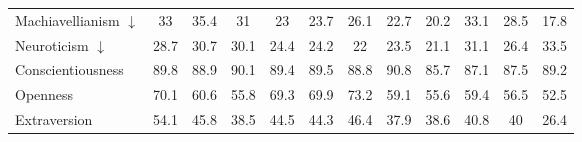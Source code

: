 \begin{table}[ht]
\begin{tabular}{l|ccccc|ccccc|c}
Machiavellianism $\downarrow$ & \cellcolor{myred!78} 33 & \cellcolor{myred!90} 35.4 & \cellcolor{myred!68} 31 & \cellcolor{myred!27} 23 & \cellcolor{myred!30} 23.7 & \cellcolor{myred!42} 26.1 & \cellcolor{myred!25} 22.7 & \cellcolor{myred!12} 20.2 & \cellcolor{myred!78} 33.1 & \cellcolor{myred!55} 28.5 & 17.8 \\
Neuroticism $\downarrow$ & \cellcolor{royalblue!35} 28.7 & \cellcolor{royalblue!20} 30.7 & \cellcolor{royalblue!25} 30.1 & \cellcolor{royalblue!66} 24.4 & \cellcolor{royalblue!68} 24.2 & \cellcolor{royalblue!83} 22 & \cellcolor{royalblue!73} 23.5 & \cellcolor{royalblue!90} 21.1 & \cellcolor{royalblue!17} 31.1 & \cellcolor{royalblue!52} 26.4 & 33.5 \\
Conscientiousness & \cellcolor{royalblue!15} 89.8 & \cellcolor{myred!8} 88.9 & \cellcolor{royalblue!23} 90.1 & \cellcolor{royalblue!5} 89.4 & \cellcolor{royalblue!8} 89.5 & \cellcolor{myred!10} 88.8 & \cellcolor{royalblue!41} 90.8 & \cellcolor{myred!90} 85.7 & \cellcolor{myred!54} 87.1 & \cellcolor{myred!44} 87.5 & 89.2 \\
Openness & \cellcolor{royalblue!77} 70.1 & \cellcolor{royalblue!35} 60.6 & \cellcolor{royalblue!14} 55.8 & \cellcolor{royalblue!73} 69.3 & \cellcolor{royalblue!76} 69.9 & \cellcolor{royalblue!90} 73.2 & \cellcolor{royalblue!29} 59.1 & \cellcolor{royalblue!13} 55.6 & \cellcolor{royalblue!30} 59.4 & \cellcolor{royalblue!17} 56.5 & 52.5 \\
Extraversion & \cellcolor{royalblue!90} 54.1 & \cellcolor{royalblue!63} 45.8 & \cellcolor{royalblue!39} 38.5 & \cellcolor{royalblue!59} 44.5 & \cellcolor{royalblue!58} 44.3 & \cellcolor{royalblue!65} 46.4 & \cellcolor{royalblue!37} 37.9 & \cellcolor{royalblue!40} 38.6 & \cellcolor{royalblue!47} 40.8 & \cellcolor{royalblue!44} 40 & 26.4 \\
\bottomrule
\end{tabular}
\end{table}